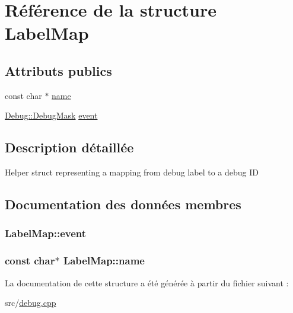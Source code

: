 \hypertarget{struct_label_map}{}\section{Référence de la structure Label\+Map}
\label{struct_label_map}
\subsection*{Attributs publics}
\begin{DoxyCompactItemize}
\item 
const char $\ast$ \hyperlink{struct_label_map_a8e4084d4e2e1ce2b69c7e8138caedb50}{name}
\item 
\hyperlink{class_debug_a9e0b892a8030a4f64076850777991c96}{Debug\+::\+Debug\+Mask} \hyperlink{struct_label_map_af76882a09bbc3fd8ecc779f612446c52}{event}
\end{DoxyCompactItemize}


\subsection{Description détaillée}
Helper struct representing a mapping from debug label to a debug I\+D 

\subsection{Documentation des données membres}
\hypertarget{struct_label_map_af76882a09bbc3fd8ecc779f612446c52}{}
\subsubsection[{event}]{ Label\+Map\+::event}\label{struct_label_map_af76882a09bbc3fd8ecc779f612446c52}
\hypertarget{struct_label_map_a8e4084d4e2e1ce2b69c7e8138caedb50}{}
\subsubsection[{name}]{\setlength{\rightskip}{0pt plus 5cm}const char$\ast$ Label\+Map\+::name}\label{struct_label_map_a8e4084d4e2e1ce2b69c7e8138caedb50}


La documentation de cette structure a été générée à partir du fichier suivant \+:\begin{DoxyCompactItemize}
\item 
src/\hyperlink{src_2debug_8cpp}{debug.\+cpp}\end{DoxyCompactItemize}
